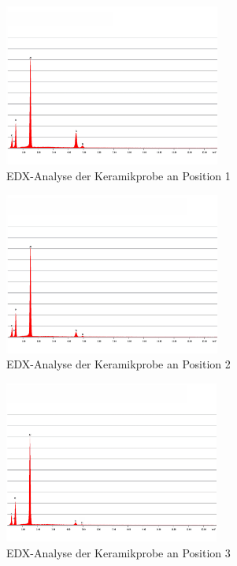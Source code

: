 \documentclass[12pt,english,ngerman]{scrartcl}
\begin{document}
\begin{figure}[H]
	\begin{center}
		\includegraphics[width =\textwidth,height=5.3cm]{./figures/edx1.png}
	\end{center}
	\caption{EDX-Analyse der Keramikprobe an Position 1~\cite{sein_foto}
	}\label{fig:position1}
\end{figure}
\begin{figure}[H]
	\begin{center}
		\includegraphics[width =\textwidth,height=5.3cm]{./figures/edx2.png}
	\end{center}
	\caption{EDX-Analyse der Keramikprobe an Position 2~\cite{sein_foto}
	}\label{fig:position2}
\end{figure}
\begin{figure}[H]
	\begin{center}
		\includegraphics[width =\textwidth,height=5.3cm]{./figures/edx3.png}
	\end{center}
	\caption{EDX-Analyse der Keramikprobe an Position 3~\cite{sein_foto}
	}\label{fig:position3}
\end{figure}
\end{document}

